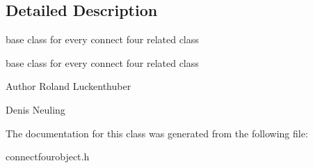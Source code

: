 \subsection{\-Detailed \-Description}
base class for every connect four related class 

base class for every connect four related class

\begin{DoxyAuthor}{\-Author}
\-Roland \-Luckenthuber 

\-Denis \-Neuling 
\end{DoxyAuthor}


\-The documentation for this class was generated from the following file\-:\begin{DoxyCompactItemize}
\item 
connectfourobject.\-h\end{DoxyCompactItemize}
